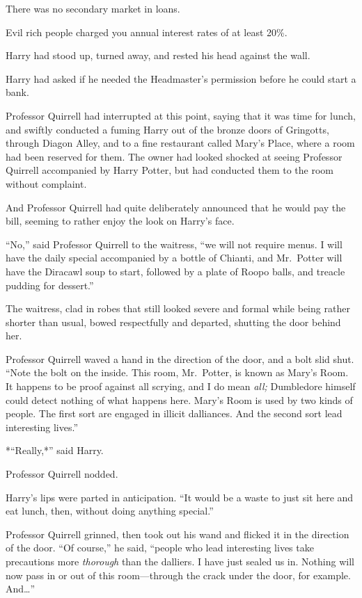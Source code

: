 There was no secondary market in loans.

Evil rich people charged you annual interest rates of at least 20\%.

Harry had stood up, turned away, and rested his head against the wall.

Harry had asked if he needed the Headmaster's permission before he could
start a bank.

Professor Quirrell had interrupted at this point, saying that it was
time for lunch, and swiftly conducted a fuming Harry out of the bronze
doors of Gringotts, through Diagon Alley, and to a fine restaurant
called Mary's Place, where a room had been reserved for them. The owner
had looked shocked at seeing Professor Quirrell accompanied by Harry
Potter, but had conducted them to the room without complaint.

And Professor Quirrell had quite deliberately announced that he would
pay the bill, seeming to rather enjoy the look on Harry's face.

``No,'' said Professor Quirrell to the waitress, ``we will not require
menus. I will have the daily special accompanied by a bottle of Chianti,
and Mr.~Potter will have the Diracawl soup to start, followed by a plate
of Roopo balls, and treacle pudding for dessert.''

The waitress, clad in robes that still looked severe and formal while
being rather shorter than usual, bowed respectfully and departed,
shutting the door behind her.

Professor Quirrell waved a hand in the direction of the door, and a bolt
slid shut. ``Note the bolt on the inside. This room, Mr.~Potter, is
known as Mary's Room. It happens to be proof against all scrying, and I
do mean \emph{all;} Dumbledore himself could detect nothing of what
happens here. Mary's Room is used by two kinds of people. The first sort
are engaged in illicit dalliances. And the second sort lead interesting
lives.''

*``Really,*'' said Harry.

Professor Quirrell nodded.

Harry's lips were parted in anticipation. ``It would be a waste to just
sit here and eat lunch, then, without doing anything special.''

Professor Quirrell grinned, then took out his wand and flicked it in the
direction of the door. ``Of course,'' he said, ``people who lead
interesting lives take precautions more \emph{thorough} than the
dalliers. I have just sealed us in. Nothing will now pass in or out of
this room---through the crack under the door, for example. And\ldots{}''

